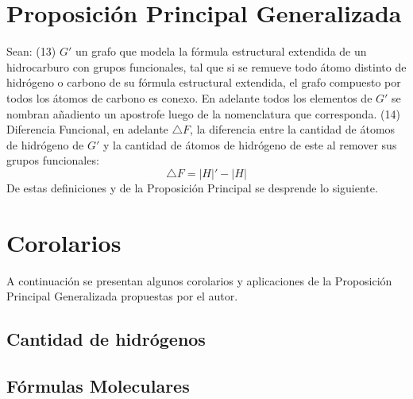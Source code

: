 \documentclass{article}
\begin{document}
\section{Proposición Principal Generalizada}
Sean:\newline
(13) $G'$ un grafo que modela la fórmula estructural extendida de un hidrocarburo con grupos funcionales, tal que si se remueve todo átomo distinto de hidrógeno o carbono de su fórmula estructural extendida, el grafo compuesto por todos los átomos de carbono es conexo. En adelante todos los elementos de $G'$ se nombran añadiento un apostrofe luego de la nomenclatura que corresponda.\newline
(14) Diferencia Funcional, en adelante $\bigtriangleup F$, la diferencia entre la cantidad de átomos de hidrógeno de $G'$ y la cantidad de átomos de hidrógeno de este al remover sus grupos funcionales:
$$\bigtriangleup F=|H|'-|H|$$
De estas definiciones y de la Proposición Principal se desprende lo siguiente.
\newtheorem{myteo4}{Teorema} 
\begin{center} 
\end{center}

\section{Corolarios}
A continuación se presentan algunos corolarios y aplicaciones de la Proposición Principal Generalizada propuestas por el autor.
\subsection{Cantidad de hidrógenos}
\newtheorem{myteo5}{Teorema} 
\begin{center} 
\end{center}
\subsection{Fórmulas Moleculares}
\end{document}
